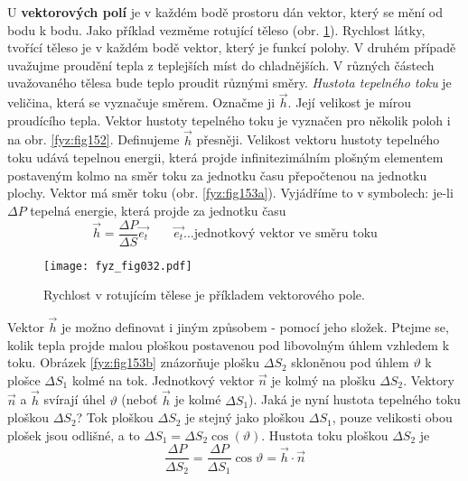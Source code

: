 {      U \textbf{vektorových polí} je v každém bodě prostoru dán vektor, který se mění od bodu k 
      bodu. Jako příklad vezměme rotující těleso (obr. \ref{fyz:fig032}). Rychlost látky, tvořící 
      těleso je v každém bodě vektor, který je funkcí polohy. V druhém případě uvažujme proudění 
      tepla z teplejších míst do chladnějších. V různých částech uvažovaného tělesa bude teplo 
      proudit různými směry. \emph{Hustota tepelného toku} je veličina, která se vyznačuje směrem. 
      Označme ji $\vec{h}$. Její velikost je mírou proudícího tepla. Vektor hustoty tepelného toku 
      je vyznačen pro několik poloh i na obr. \ref{fyz:fig152}. Definujeme $\vec{h}$ 
      přesněji. Velikost vektoru hustoty tepelného toku udává tepelnou energii, která projde 
      infinitezimálním plošným elementem postaveným kolmo na směr toku za jednotku času přepočtenou 
      na  jednotku plochy. Vektor má směr toku (obr. \ref{fyz:fig153a}). Vyjádříme to v 
      symbolech: je-li $\Delta P$ tepelná energie, která projde za jednotku času
      \begin{equation*}     %
       \vec{h}=\frac{\Delta P}{\Delta S}\vec{e_t}
               \qquad \vec{e_t}\ldots\text{jednotkový vektor ve směru toku}
      \end{equation*}   

      \begin{figure}[ht!]  %
        \centering
        \texttt{[image: fyz\_fig032.pdf]}
        \caption{Rychlost v rotujícím tělese je příkladem vektorového pole.
                 \cite[s.~30]{Feynman02}}  
        \label{fyz:fig032} 
      \end{figure}            
      Vektor $\vec{h}$ je možno definovat i jiným způsobem - pomocí jeho složek. Ptejme se, kolik 
      tepla projde malou ploškou postavenou pod libovolným úhlem vzhledem k toku. Obrázek 
      \ref{fyz:fig153b} znázorňuje plošku $\Delta S_2$ skloněnou pod úhlem $\vartheta$ k plošce 
      $\Delta S_1$ kolmé na tok. Jednotkový vektor $\vec{n}$ je kolmý na plošku $\Delta S_2$. 
      Vektory $\vec{n}$ a $\vec{h}$ svírají úhel $\vartheta$ (neboť $\vec{h}$ je kolmé $\Delta 
      S_1$). Jaká je nyní hustota tepelného toku ploškou $\Delta S_2$? Tok ploškou $\Delta S_2$ je 
      stejný jako ploškou $\Delta S_1$, pouze velikosti obou plošek jsou odlišné, a to $\Delta 
      S_1=\Delta S_2\cos(\vartheta)$. Hustota toku ploškou $\Delta S_2$ je 
      \begin{equation}\label{fyz:eq248}
       \frac{\Delta P}{\Delta S_2}=\frac{\Delta P}{\Delta S_1}\cos{\vartheta}=\vec{h}\cdot\vec{n}
      \end{equation}
      
}
